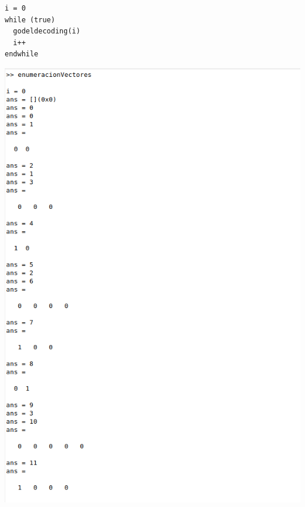 \documentclass[fleqn, 10pt]{article}
\begin{document}
\begin{verbatim}
i = 0
while (true)
  godeldecoding(i)
  i++
endwhile
\end{verbatim}
\includegraphics[scale=0.5]{Vectores}
\end{document}
